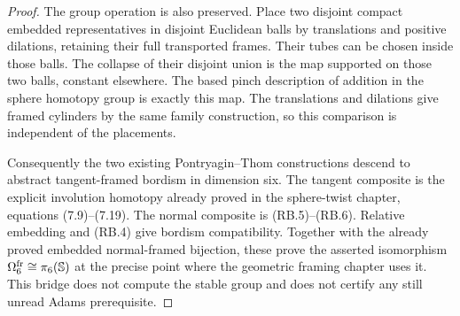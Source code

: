 \begin{proof}
The group operation is also preserved.  Place two disjoint compact
embedded representatives in disjoint Euclidean balls by translations
and positive dilations, retaining their full transported frames.  Their
tubes can be chosen inside those balls.  The collapse of their disjoint
union is the map supported on those two balls, constant elsewhere.
The based pinch description of addition in the sphere homotopy group
is exactly this map.  The translations and dilations give framed
cylinders by the same family construction, so this comparison is
independent of the placements.

Consequently the two existing Pontryagin--Thom constructions descend to
abstract tangent-framed bordism in dimension six.  The tangent composite
is the explicit involution homotopy already proved in the sphere-twist
chapter, equations (7.9)--(7.19).  The normal composite is
(RB.5)--(RB.6).  Relative embedding and (RB.4) give bordism compatibility.
Together with the already proved embedded normal-framed bijection, these
prove the asserted isomorphism
$\Omega^{\rm fr}_6\cong\pi_6(\mathbb S)$ at the precise point where
the geometric framing chapter uses it.  This bridge does not compute
the stable group and does not certify any still unread Adams prerequisite.
\end{proof}

